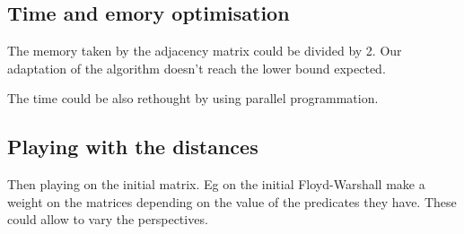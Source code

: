 \documentclass{article}
\begin{document}
\subsection{Time and emory optimisation}
The memory taken by the adjacency matrix could be divided by 2. Our adaptation of the algorithm doesn't reach the lower bound expected. 

The time could be also rethought by using parallel programmation. 


\subsection{Playing with the distances}
Then playing on the initial matrix. Eg on the initial Floyd-Warshall make a weight on the matrices depending on the value of the predicates they have. These could allow to vary the perspectives.

\printbibliography[
heading=bibintoc,
title={Bibliography}
]
\end{document}
